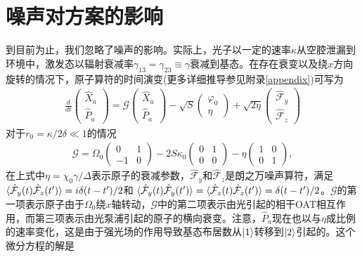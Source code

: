 \section{噪声对方案的影响}
\vbox{}
到目前为止，我们忽略了噪声的影响。实际上，光子以一定的速率$\kappa$从空腔泄漏到环境中，激发态以辐射衰减率$\gamma_{13}=\gamma_{23}\equiv \gamma$衰减到基态。在存在衰变以及绕$x$方向旋转的情况下，原子算符的时间演变(更多详细推导参见附录\ref{appendix})可写为
\begin{eqnarray}
\frac{d}{{dt}}\left( {\begin{array}{*{20}{l}}
	{{{\hat X}_a}}\\
	{{{\hat P}_a}}
	\end{array}} \right) = \mathcal{G}\left( {\begin{array}{*{20}{l}}
	{{{\hat X}_a}}\\
	{{{\hat P}_a}}
	\end{array}} \right) - \sqrt S \left( {\begin{array}{*{20}{l}}
	{\varphi_0}\\
	\eta
	\end{array}} \right)
+ \sqrt {2\eta } \left( {\begin{array}{*{20}{l}}
	{{{\hat {\mathcal{F}}}_y}}\\
	{{{\hat {\mathcal{F}}}_z}}
	\end{array}} \right)\label{eq4421}
\end{eqnarray}
对于$r_0=\kappa/2\delta\ll 1$的情况
\begin{eqnarray}
\mathcal{G}={\Omega _0}\left( {\begin{array}{*{20}{c}}
	0&{ 1}\\
	-1&0
	\end{array}} \right) - 2S{\kappa _0}\left( {\begin{array}{*{20}{c}}
	0&1\\
	0&0
	\end{array}} \right) - \eta \left( {\begin{array}{*{20}{c}}
	1&0\\
	0&1
	\end{array}} \right),\label{eq4422}
\end{eqnarray}
在上式中$\eta=\chi_0\gamma/\Delta$表示原子的衰减参数，$\hat {\mathcal{F}}_y$和$\hat {\mathcal{F}}_z$是朗之万噪声算符，满足$\braket{\hat{\mathcal{F}}_y(t) \hat{\mathcal{F}}_z(t')}= i\delta(t-t')/2$和 $
\braket{\hat{\mathcal{F}}_y(t)\hat{\mathcal{F}}_y(t')}=\braket{\hat{\mathcal{F}}_z(t)\hat{\mathcal{F}}_z(t')}=\delta(t-t')/2$。$\mathcal{G}$的第一项表示原子由于$\Omega_0$绕$x$轴转动，$\mathcal{G}$中的第二项表示由光引起的相干OAT相互作用，而第三项表示由光泵浦引起的原子的横向衰变。注意，$\hat{P}_a$现在也以与$\eta$成比例的速率变化，这是由于强光场的作用导致基态布居数从$\ket{1}$转移到$\ket{2}$引起的。这个微分方程的解是
